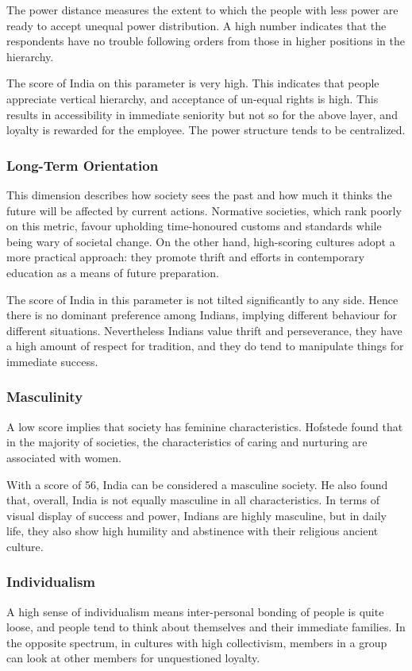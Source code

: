 \documentclass{article}
\begin{document}
The power distance measures the extent to which the people with less power are ready to accept unequal power distribution. A high number indicates that the respondents have no trouble following orders from those in higher positions in the hierarchy.

The score of India on this parameter is very high. This indicates that people appreciate vertical hierarchy, and acceptance of un-equal rights is high. This results in accessibility in immediate seniority but not so for the above layer, and loyalty is rewarded for the employee. The power structure tends to be centralized.

\subsubsection{Long-Term Orientation}

This dimension describes how society sees the past and how much it thinks the future will be affected by current actions. Normative societies, which rank poorly on this metric, favour upholding time-honoured customs and standards while being wary of societal change. On the other hand, high-scoring cultures adopt a more practical approach: they promote thrift and efforts in contemporary education as a means of future preparation.

The score of India in this parameter is not tilted significantly to any side. Hence there is no dominant preference among Indians, implying different behaviour for different situations. Nevertheless Indians value thrift and perseverance, they have a high amount of respect for tradition, and they do tend to manipulate things for immediate success.

\subsubsection{Masculinity}

A low score implies that society has feminine characteristics. Hofstede found that in the majority of societies, the characteristics of caring and nurturing are associated with women.

With a score of 56, India can be considered a masculine society. He also found that, overall, India is not equally masculine in all characteristics. In terms of visual display of success and power, Indians are highly masculine, but in daily life, they also show high humility and abstinence with their religious ancient culture.

\subsubsection{Individualism}
A high sense of individualism means inter-personal bonding of people is quite loose, and people tend to think about themselves and their immediate families. In the opposite spectrum, in cultures with high collectivism, members in a group can look at other members for unquestioned loyalty.
\end{document}

